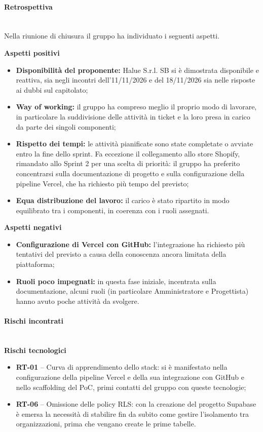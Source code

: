 \paragraph{Retrospettiva}~\\[0.15cm]
Nella riunione di chiusura il gruppo ha individuato i seguenti aspetti.

\vspace{1mm}
\noindent\textbf{Aspetti positivi}
\begin{itemize}
    \item \textbf{Disponibilità del proponente:} Halue S.r.l. SB si è dimostrata disponibile e reattiva, sia negli incontri dell'11/11/2026 e del 18/11/2026 sia nelle risposte ai dubbi sul capitolato;
    \item \textbf{Way of working:} il gruppo ha compreso meglio il proprio modo di lavorare, in particolare la suddivisione delle attività in ticket e la loro presa in carico da parte dei singoli componenti;
    \item \textbf{Rispetto dei tempi:} le attività pianificate sono state completate o avviate entro la fine dello sprint. Fa eccezione il collegamento allo store Shopify, rimandato allo Sprint 2 per una scelta di priorità: il gruppo ha preferito concentrarsi sulla documentazione di progetto e sulla configurazione della pipeline Vercel, che ha richiesto più tempo del previsto;
    \item \textbf{Equa distribuzione del lavoro:} il carico è stato ripartito in modo equilibrato tra i componenti, in coerenza con i ruoli assegnati.
\end{itemize}

\noindent\textbf{Aspetti negativi}
\begin{itemize}
    \item \textbf{Configurazione di Vercel con GitHub:} l'integrazione ha richiesto più tentativi del previsto a causa della conoscenza ancora limitata della piattaforma;
    \item \textbf{Ruoli poco impegnati:} in questa fase iniziale, incentrata sulla documentazione, alcuni ruoli (in particolare Amministratore e Progettista) hanno avuto poche attività da svolgere.
\end{itemize}

\paragraph{Rischi incontrati}~\\[0.15cm]
\noindent\textbf{Rischi tecnologici}
\begin{itemize}
    \item \textbf{RT-01} -- Curva di apprendimento dello stack: si è manifestato nella configurazione della pipeline Vercel e della sua integrazione con GitHub e nello scaffolding del PoC, primi contatti del gruppo con queste tecnologie;
    \item \textbf{RT-06} -- Omissione delle policy RLS: con la creazione del progetto Supabase è emersa la necessità di stabilire fin da subito come gestire l'isolamento tra organizzazioni, prima che vengano create le prime tabelle.
\end{itemize}

